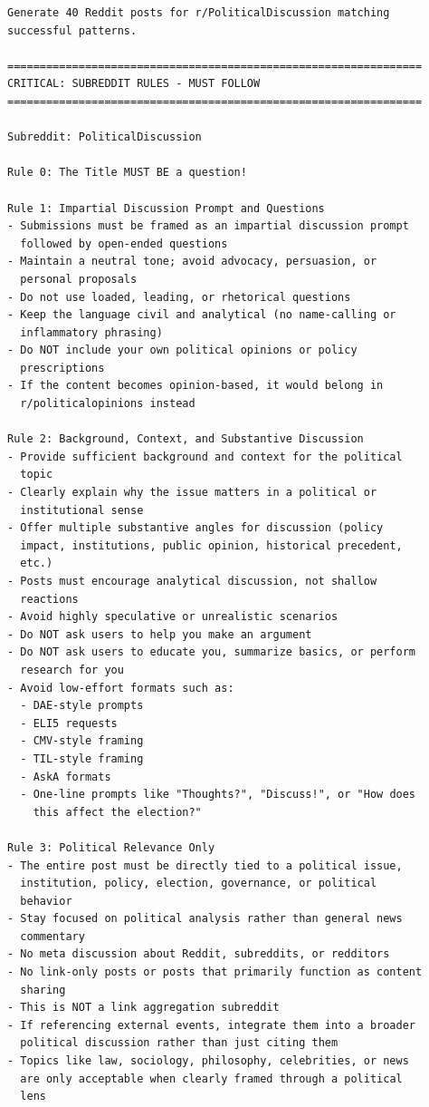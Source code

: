 \begin{small}
\begin{verbatim}
Generate 40 Reddit posts for r/PoliticalDiscussion matching 
successful patterns.

================================================================
CRITICAL: SUBREDDIT RULES - MUST FOLLOW
================================================================

Subreddit: PoliticalDiscussion

Rule 0: The Title MUST BE a question!

Rule 1: Impartial Discussion Prompt and Questions
- Submissions must be framed as an impartial discussion prompt 
  followed by open-ended questions
- Maintain a neutral tone; avoid advocacy, persuasion, or 
  personal proposals
- Do not use loaded, leading, or rhetorical questions
- Keep the language civil and analytical (no name-calling or 
  inflammatory phrasing)
- Do NOT include your own political opinions or policy 
  prescriptions
- If the content becomes opinion-based, it would belong in 
  r/politicalopinions instead

Rule 2: Background, Context, and Substantive Discussion
- Provide sufficient background and context for the political 
  topic
- Clearly explain why the issue matters in a political or 
  institutional sense
- Offer multiple substantive angles for discussion (policy 
  impact, institutions, public opinion, historical precedent, 
  etc.)
- Posts must encourage analytical discussion, not shallow 
  reactions
- Avoid highly speculative or unrealistic scenarios
- Do NOT ask users to help you make an argument
- Do NOT ask users to educate you, summarize basics, or perform 
  research for you
- Avoid low-effort formats such as:
  - DAE-style prompts
  - ELI5 requests
  - CMV-style framing
  - TIL-style framing
  - AskA formats
  - One-line prompts like "Thoughts?", "Discuss!", or "How does 
    this affect the election?"

Rule 3: Political Relevance Only
- The entire post must be directly tied to a political issue, 
  institution, policy, election, governance, or political 
  behavior
- Stay focused on political analysis rather than general news 
  commentary
- No meta discussion about Reddit, subreddits, or redditors
- No link-only posts or posts that primarily function as content 
  sharing
- This is NOT a link aggregation subreddit
- If referencing external events, integrate them into a broader 
  political discussion rather than just citing them
- Topics like law, sociology, philosophy, celebrities, or news 
  are only acceptable when clearly framed through a political 
  lens


\end{verbatim}
\end{small}
